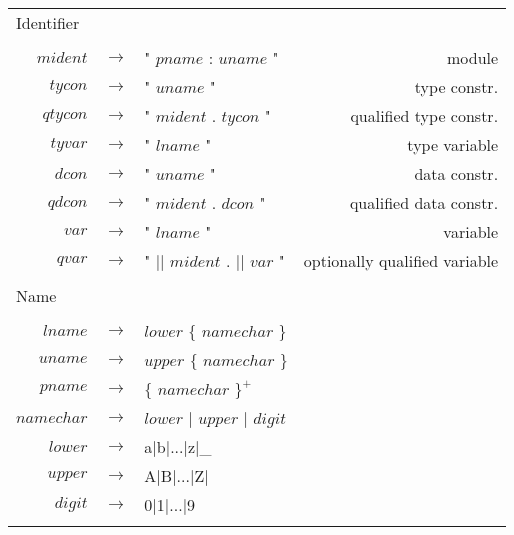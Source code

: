 \begin{footnotesize}
\begin{longtable}{ r c l r }
\multicolumn{4}{l}{Identifier}			 \\
\\[0.01in]
$mident$	& $ \rightarrow $	& " $pname$ : $uname$ "												& module		\\
$tycon$		& $ \rightarrow $	& " $uname$ "													& type constr.		\\
$qtycon$	& $ \rightarrow $	& " $mident$ . $tycon$ "											& qualified type constr.\\
$tyvar$		& $ \rightarrow $	& " $lname$ "													& type variable		\\
$dcon$		& $ \rightarrow $	& " $uname$ "													& data constr.		\\
$qdcon$		& $ \rightarrow $	& " $mident$ . $dcon$ "												& qualified data constr.\\
$var$		& $ \rightarrow $	& " $lname$ "													& variable		\\
$qvar$		& $ \rightarrow $	& " $||$ $mident$ . $||$ $var$ "										& optionally qualified variable\\
\\[0.01in]

\multicolumn{4}{l}{Name}			 \\
\\[0.01in]
$lname$		& $ \rightarrow $	& $lower$ $\{$ $namechar$ $\}$								& \\
$uname$		& $ \rightarrow $	& $upper$ $\{$ $namechar$ $\}$								& \\
$pname$		& $ \rightarrow $	& $\{$ $namechar$ $\}^{+}$								& \\
$namechar$	& $ \rightarrow $	& $lower$ $|$ $upper$ $|$ $digit$							& \\
$lower$		& $ \rightarrow $	& a$|$b$|$...$|$z$|$\_									& \\
$upper$		& $ \rightarrow $	& A$|$B$|$...$|$Z$|$									& \\
$digit$		& $ \rightarrow $	& 0$|$1$|$...$|$9									& \\
\\[0.01in]

\end{longtable}
\end{footnotesize}

